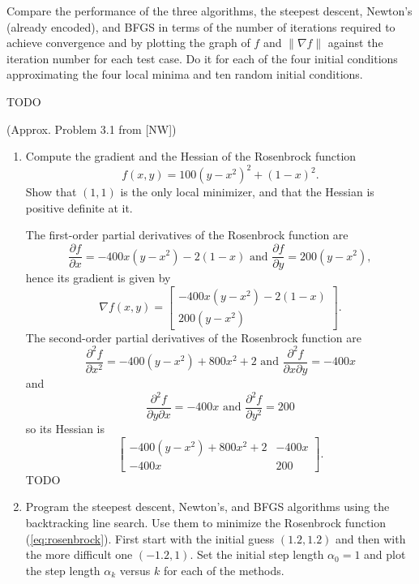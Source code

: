 \documentclass{../kin_math}
\begin{document}
\begin{questions}
  Compare the performance of the three algorithms, the steepest descent, Newton's (already encoded), and BFGS in terms of the number of iterations required to achieve convergence and by plotting the graph of $f$ and $\lVert \nabla f \rVert$ against the iteration number for each test case. Do it for each of the four initial conditions approximating the four local minima and ten random initial conditions.
  \begin{solution}
    TODO
  \end{solution}

  \question (Approx. Problem 3.1 from [NW])
  \begin{enumerate}
    \item Compute the gradient and the Hessian of the Rosenbrock function
    \begin{equation}
      \label{eq:rosenbrock}
      f(x, y) = 100(y - x^2)^2 + (1 - x)^2.
    \end{equation}
    Show that $(1, 1)$ is the only local minimizer, and that the Hessian is positive definite at it.
    \begin{solution}
      The first-order partial derivatives of the Rosenbrock function are
      \begin{equation*}
        \frac{\partial f}{\partial x} = -400x(y - x^2) - 2(1 - x) \text{ and } \frac{\partial f}{\partial y} = 200(y - x^2),
      \end{equation*}
      hence its gradient is given by
      \begin{equation*}
        \nabla f(x, y) = \begin{bmatrix} -400x(y - x^2) - 2(1 - x) \\ 200(y - x^2) \end{bmatrix}.
      \end{equation*}
      The second-order partial derivatives of the Rosenbrock function are
      \begin{equation*}
        \frac{\partial^2 f}{\partial x^2} = -400(y - x^2) + 800x^2 + 2 \text{ and } \frac{\partial^2 f}{\partial x \partial y} = -400x
      \end{equation*}
      and
      \begin{equation*}
        \frac{\partial^2 f}{\partial y \partial x} = -400x \text{ and } \frac{\partial^2 f}{\partial y^2} = 200
      \end{equation*}
      so its Hessian is
      \begin{equation*}
        \begin{bmatrix}
          -400(y - x^2) + 800x^2 + 2 & -400x \\ -400x & 200
        \end{bmatrix}.
      \end{equation*}
      TODO
    \end{solution}
    \item Program the steepest descent, Newton's, and BFGS algorithms using the backtracking line search. Use them to minimize the Rosenbrock function (\ref{eq:rosenbrock}). First start with the initial guess $(1.2, 1.2)$ and then with the more difficult one $(-1.2, 1)$. Set the initial step length $\alpha_0 = 1$ and plot the step length $\alpha_k$ versus $k$ for each of the methods.


\end{enumerate}
\end{questions}
\end{document}
